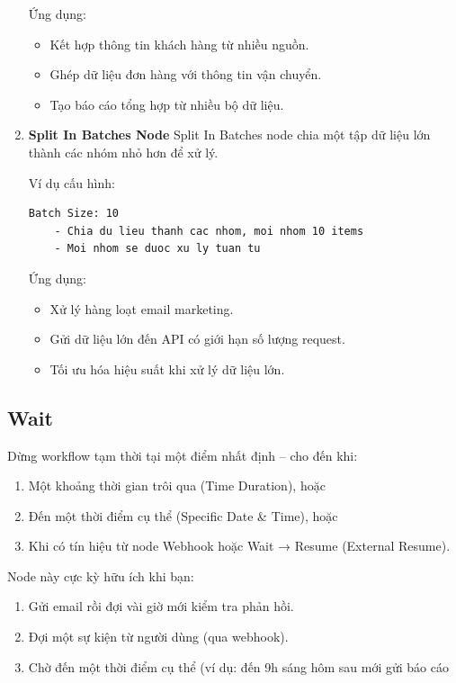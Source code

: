 \begin{enumerate}
    Ứng dụng:
    \begin{itemize}
        \item Kết hợp thông tin khách hàng từ nhiều nguồn.
        \item Ghép dữ liệu đơn hàng với thông tin vận chuyển.
        \item Tạo báo cáo tổng hợp từ nhiều bộ dữ liệu.
    \end{itemize}

    \item \textbf{Split In Batches Node}  
    Split In Batches node chia một tập dữ liệu lớn thành các nhóm nhỏ hơn để xử lý.  

    Ví dụ cấu hình:
\begin{verbatim}
Batch Size: 10
    - Chia du lieu thanh cac nhom, moi nhom 10 items
    - Moi nhom se duoc xu ly tuan tu
\end{verbatim}


    Ứng dụng:
    \begin{itemize}
        \item Xử lý hàng loạt email marketing.
        \item Gửi dữ liệu lớn đến API có giới hạn số lượng request.
        \item Tối ưu hóa hiệu suất khi xử lý dữ liệu lớn.
    \end{itemize}
\end{enumerate}

\subsection{Wait}
Dừng workflow tạm thời tại một điểm nhất định – cho đến khi:
\begin{enumerate}
    \item Một khoảng thời gian trôi qua (Time Duration), hoặc
    \item Đến một thời điểm cụ thể (Specific Date \& Time), hoặc

    \item Khi có tín hiệu từ node Webhook hoặc Wait → Resume (External Resume).
\end{enumerate}

Node này cực kỳ hữu ích khi bạn:
\begin{enumerate}
    \item Gửi email rồi đợi vài giờ mới kiểm tra phản hồi.

    \item Đợi một sự kiện từ người dùng (qua webhook).

    \item Chờ đến một thời điểm cụ thể (ví dụ: đến 9h sáng hôm sau mới gửi báo cáo
\end{enumerate}

